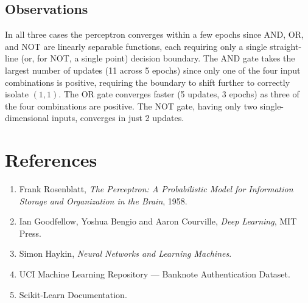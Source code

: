 \documentclass[12pt,a4paper]{article}
\begin{document}
\subsection{Observations}

In all three cases the perceptron converges within a few epochs since AND, OR, and
NOT are linearly separable functions, each requiring only a single straight-line
(or, for NOT, a single point) decision boundary. The AND gate takes the largest
number of updates (11 across 5 epochs) since only one of the four input
combinations is positive, requiring the boundary to shift further to correctly
isolate $(1,1)$. The OR gate converges faster (5 updates, 3 epochs) as three of the
four combinations are positive. The NOT gate, having only two single-dimensional
inputs, converges in just 2 updates.

\section{References}

\begin{enumerate}

\item Frank Rosenblatt, \textit{The Perceptron: A Probabilistic Model for Information Storage and Organization in the Brain}, 1958.

\item Ian Goodfellow, Yoshua Bengio and Aaron Courville, \textit{Deep Learning}, MIT Press.

\item Simon Haykin, \textit{Neural Networks and Learning Machines}.

\item UCI Machine Learning Repository — Banknote Authentication Dataset.

\item Scikit-Learn Documentation.

\end{enumerate}
\end{document}
